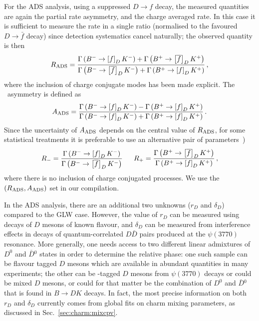 For the ADS analysis, using a suppressed $D \to f$ decay,
the measured quantities are again the partial rate asymmetry, 
and the charge averaged rate.
In this case it is sufficient to measure the rate in a single ratio
(normalised to the favoured $D \to \bar{f}$ decay)
since detection systematics cancel naturally;
the observed quantity is then
\begin{equation}
  \label{eq:cp_uta:dk:r_ads}
  R_{\rm ADS} = 
  \frac{
    \Gamma \left( \Bm \to \left[ f \right]_D \Km \right) + 
    \Gamma \left( \Bp \to \left[ \bar{f} \right]_D \Kp \right)
  }{
    \Gamma \left( \Bm \to \left[ \bar{f} \right]_D \Km \right) +
    \Gamma \left( \Bp \to \left[ f \right]_D \Kp \right)
  } \, ,
\end{equation}
where the inclusion of charge conjugate modes has been made explicit.
The \CP\ asymmetry is defined as
\begin{equation}
  \label{eq:cp_uta:dk:a_ads}
  A_{\rm ADS} = 
  \frac{
    \Gamma\left(B^{-}\to\left[f\right]_DK^-\right)-
    \Gamma\left(B^{+}\to\left[f\right]_DK^+\right)
  }{
    \Gamma\left(B^{-}\to\left[f\right]_DK^-\right)+
    \Gamma\left(B^{+}\to\left[f\right]_DK^+\right)
  } \, .
\end{equation}
Since the uncertainty of $A_{\rm ADS}$ depends on the central value of $R_{\rm ADS}$, for some statistical treatments it is preferable to use an alternative pair of parameters~\cite{Bondar:2004bi})
\begin{equation}
  R_- = \frac{
    \Gamma \left( \Bm \to \left[ f \right]_D \Km \right)
  }{
    \Gamma \left( \Bm \to \left[ \bar{f} \right]_D \Km \right)
  } \, 
  \hspace{5mm}
  R_+ = \frac{
    \Gamma \left( \Bp \to \left[ \bar{f} \right]_D \Kp \right)
  }{
    \Gamma \left( \Bp \to \left[ f \right]_D \Kp \right)
  } \, ,
\end{equation}
where there is no inclusion of charge conjugated processes.
We use the $(R_{\rm ADS}, A_{\rm ADS})$ set in our compilation.

In the ADS analysis, there are an additional two unknowns ($r_D$ and $\delta_D$)
compared to the GLW case.  
However, the value of $r_D$ can be measured using 
decays of $D$ mesons of known flavour, and $\delta_D$ can be measured from interference effects in decays of quantum-correlated $D\bar{D}$ pairs produced at the $\psi(3770)$ resonance.
More generally, one needs access to two different linear admixtures of $D^0$ and $\bar{D}{}^0$ states in order to determine the relative phase: one such sample can be flavour tagged $D$ mesons which are available in abundant quantities in many experiments; the other can be \CP-tagged $D$ mesons from $\psi(3770)$ decays or could be mixed $D$ mesons, or could for that matter be the combination of $D^0$ and $\bar{D}{}^0$ that is found in $B \to DK$ decays.
In fact, the most precise information on both $r_D$ and $\delta_D$ currently comes from global fits on charm mixing parameters, as discussed in Sec.~\ref{sec:charm:mixcpv}.

